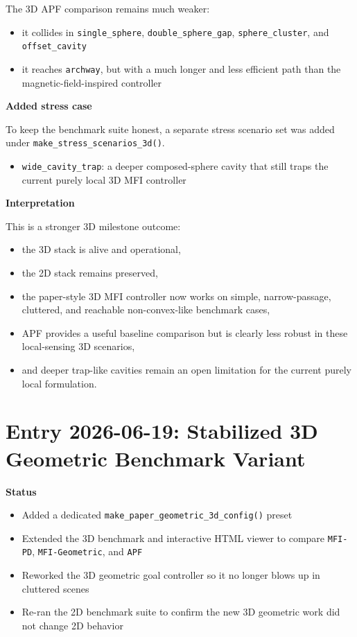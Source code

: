 \documentclass[11pt]{article}
\begin{document}
The 3D APF comparison remains much weaker:

\begin{itemize}[leftmargin=*]
  \item it collides in \texttt{single\_sphere}, \texttt{double\_sphere\_gap}, \texttt{sphere\_cluster}, and \texttt{offset\_cavity}
  \item it reaches \texttt{archway}, but with a much longer and less efficient path than the magnetic-field-inspired controller
\end{itemize}

\textbf{Added stress case}

To keep the benchmark suite honest, a separate stress scenario set was added
under \texttt{make\_stress\_scenarios\_3d()}.

\begin{itemize}[leftmargin=*]
  \item \texttt{wide\_cavity\_trap}: a deeper composed-sphere cavity that still traps the current purely local 3D MFI controller
\end{itemize}

\textbf{Interpretation}

This is a stronger 3D milestone outcome:

\begin{itemize}[leftmargin=*]
  \item the 3D stack is alive and operational,
  \item the 2D stack remains preserved,
  \item the paper-style 3D MFI controller now works on simple, narrow-passage, cluttered, and reachable non-convex-like benchmark cases,
  \item APF provides a useful baseline comparison but is clearly less robust in these local-sensing 3D scenarios,
  \item and deeper trap-like cavities remain an open limitation for the current purely local formulation.
\end{itemize}

\section*{Entry 2026-06-19: Stabilized 3D Geometric Benchmark Variant}

\textbf{Status}

\begin{itemize}[leftmargin=*]
  \item Added a dedicated \texttt{make\_paper\_geometric\_3d\_config()} preset
  \item Extended the 3D benchmark and interactive HTML viewer to compare \texttt{MFI-PD}, \texttt{MFI-Geometric}, and \texttt{APF}
  \item Reworked the 3D geometric goal controller so it no longer blows up in cluttered scenes
  \item Re-ran the 2D benchmark suite to confirm the new 3D geometric work did not change 2D behavior
\end{itemize}
\end{document}
